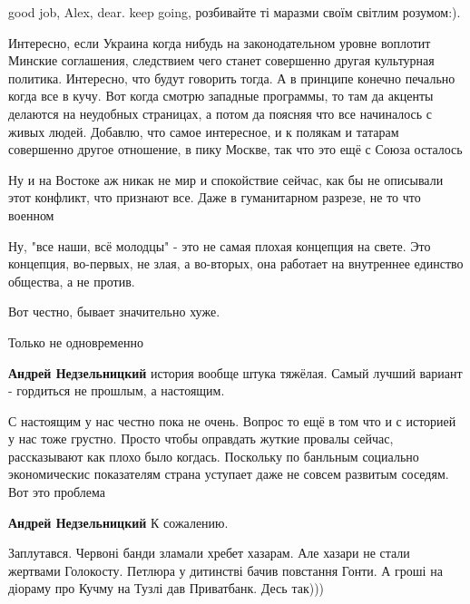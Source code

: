 \begin{itemize}
good job, Alex, dear. keep going, розбивайте ті маразми своїм світлим
розумом:).


Интересно, если Украина когда нибудь на законодательном уровне воплотит Минские
соглашения, следствием чего станет совершенно другая культурная политика.
Интересно, что будут говорить тогда. А в принципе конечно печально когда все в
кучу. Вот когда смотрю западные программы, то там да акценты делаются на
неудобных страницах, а потом да поясняя что все начиналось с живых людей.
Добавлю, что самое интересное, и к полякам и татарам совершенно другое
отношение, в пику Москве, так что это ещё с Союза осталось


Ну и на Востоке аж никак не мир и спокойствие сейчас, как бы не описывали этот
конфликт, что признают все. Даже в гуманитарном разрезе, не то что военном


Ну, "все наши, всё молодцы" - это не самая плохая концепция на свете. Это
концепция, во-первых, не злая, а во-вторых, она работает на внутреннее единство
общества, а не против.

Вот честно, бывает значительно хуже.

\begin{itemize} %
Только не одновременно

\textbf{Андрей Недзельницкий} история вообще штука тяжёлая. Самый лучший вариант - гордиться не прошлым, а настоящим.


С настоящим у нас честно пока не очень. Вопрос то ещё в том что и с историей у
нас тоже грустно. Просто чтобы оправдать жуткие провалы сейчас, рассказывают
как плохо было когдась. Поскольку по банльным социально экономическис
показателям страна уступает даже не совсем развитым соседям. Вот это проблема

\textbf{Андрей Недзельницкий} К сожалению.

\end{itemize} %


Заплутався. Червоні банди зламали хребет хазарам. Але хазари не стали жертвами
Голокосту. Петлюра у дитинстві бачив повстання Гонти. А гроші на діораму про
Кучму на Тузлі дав Приватбанк. Десь так)))


\end{itemize}
